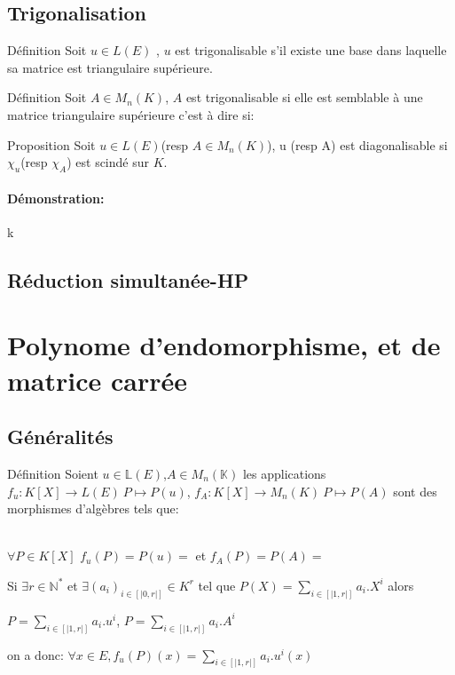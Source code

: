 \documentclass{book}
\begin{document}
\subsection{Trigonalisation}
\begin{Définition}[]{Définition}{}
Soit \(u \in L(E)\) , $u$ est trigonalisable  s'il existe une base dans laquelle sa matrice est triangulaire supérieure.
\end{Définition}
\begin{Définition}[]{Définition}{}
Soit \(A \in M_{n}(K)\), $A$ est trigonalisable si elle est semblable à une matrice triangulaire supérieure c'est à dire si:
\\
\end{Définition}
\begin{Propriété}[]{Proposition}{}
Soit \(u \in L(E)\)(resp \(A \in M_{n}(K)\)), u (resp A) est diagonalisable si \(\chi_{u}\)(resp \(\chi_{A}\)) est scindé sur $K$.
\end{Propriété}
\paragraph{Démonstration:}
k
\subsection{Réduction simultanée-HP}
\section{Polynome d'endomorphisme, et de matrice carrée}
\subsection{Généralités}
\begin{Définition}[]{Définition}{}
Soient \(u \in \mathbb{L}(E)\),\(A \in M_n(\mathbb{K})\)
les applications \(f_{u}:K[X] \rightarrow L(E) \ P \mapsto P(u)\), \(f_{A}:K[X] \rightarrow M_n(K)\ P \mapsto P(A)  \) sont des morphismes d'algèbres tels que: \begin{center}
\begin{framed}\\
\(\forall P \in K[X]\)  \(f_{u}(P)=P(u)=\) et \(f_{A}(P)=P(A)=\) \end{framed}\end{center}
Si \(\exists r \in \mathbb{N}^*\) et \(\exists (a_{i})_{i \in [|0,r|]} \in K^r\) tel que \(P(X)=\sum_{i \in [|1,r|]} a_{i}.X^i\) alors \begin{center} \begin{framed}
\(P=\sum_{i \in [|1,r|]}a_{i}.u^i\), \(P=\sum_{i \in [|1,r|]}a_{i}.A^i\)
 \end{framed}
\end{center}
on a donc:
 \(\forall x \in E, f_{u}(P)(x)=\sum_{i \in [|1,r|]}a_{i}.u^i(x)\)
\end{Définition}
\end{document}

